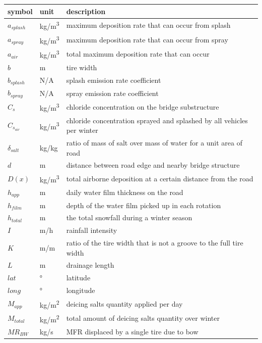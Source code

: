 \documentclass[12pt]{article}
\begin{document}
\renewcommand{\arraystretch}{1.2}
\noindent \begin{longtable*}{l l p{12cm}} \toprule
\textbf{symbol} & \textbf{unit} & \textbf{description}\\
\midrule 
$a_{splash}$ & \si{kg/m^3} & maximum deposition rate that can occur from splash\\
$a_{spray}$ & \si{kg/m^3} & maximum deposition rate that can occur from spray\\
$a_{air}$ & \si{kg/m^3} & total maximum deposition rate that can occur\\
$b$ & \si{m} & tire width\\
$b_{splash}$ & N/A & splash emission rate coefficient\\
$b_{spray}$ & N/A & spray emission rate coefficient\\
$C_s$ & \si{kg/m^3} & chloride concentration on the bridge substructure\\
$C_{s_{air}}$ & \si{kg/m^3} & chloride concentration sprayed and splashed by all vehicles per winter\\
$\delta_{salt}$ & kg/kg & ratio of mass of salt over mass of water for a unit area of road\\
$d$ & \si{m} & distance between road edge and nearby bridge structure\\
$D(x)$ & \si{kg/m^3} & total airborne deposition at a certain distance from the road\\
$h_{app}$ & \si{m} & daily water film thickness on the road\\
$h_{film}$ & \si{m} & depth of the water film picked up in each rotation\\
$h_{total}$ & \si{m} & the total snowfall during a winter season\\
$I$ & \si{m/h} & rainfall intensity\\
$K$ & m/m & ratio of the tire width that is not a groove to the full tire width\\
$L$ & \si{m} & drainage length\\
$lat$ & \si{\degree} & latitude\\
$long$ & \si{\degree} & longitude\\
$M_{app}$ & \si{kg/m^2} & deicing salts quantity applied per day\\
$M_{total}$ & \si{kg/m^2} & total amount of deicing salts quantity over winter\\
$\mathit{MR_{BW}}$ & \si{kg/s} & MFR displaced by a single tire due to bow\\

\end{longtable*}
\end{document}

